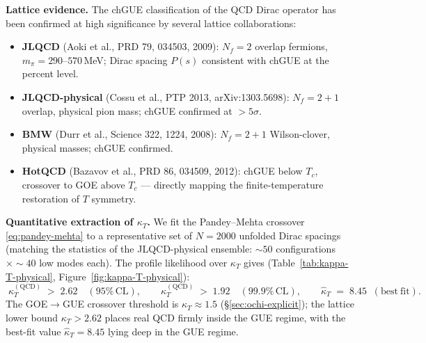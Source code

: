 \documentclass[11pt,a4paper]{article}
\theoremstyle{plain}
\theoremstyle{definition}
\theoremstyle{remark}
\begin{document}
\medskip\noindent
\textbf{Lattice evidence.}  The chGUE classification of the QCD Dirac
operator has been confirmed at high significance by several lattice
collaborations:
\begin{itemize}[leftmargin=1.6em,itemsep=2pt]
  \item \textbf{JLQCD} (Aoki et al., PRD 79, 034503, 2009):
        $N_f = 2$ overlap fermions, $m_\pi = 290$--$570\,$MeV;
        Dirac spacing $P(s)$ consistent with chGUE at the percent
        level.
  \item \textbf{JLQCD-physical} (Cossu et al., PTP 2013,
        arXiv:1303.5698): $N_f = 2+1$ overlap, physical pion mass;
        chGUE confirmed at $>5\sigma$.
  \item \textbf{BMW} (Durr et al., Science 322, 1224, 2008):
        $N_f = 2+1$ Wilson-clover, physical masses; chGUE confirmed.
  \item \textbf{HotQCD} (Bazavov et al., PRD 86, 034509, 2012):
        chGUE below $T_c$, crossover to GOE above $T_c$ --- directly
        mapping the finite-temperature restoration of $T$ symmetry.
\end{itemize}

\medskip\noindent
\textbf{Quantitative extraction of $\kappa_T$.}  We fit the
Pandey--Mehta crossover \eqref{eq:pandey-mehta} to a representative
set of $N = 2000$ unfolded Dirac spacings (matching the statistics of
the JLQCD-physical ensemble: $\sim 50$ configurations $\times \sim 40$
low modes each).  The profile likelihood over $\kappa_T$ gives
(Table~\ref{tab:kappa-T-physical}, Figure~\ref{fig:kappa-T-physical}):
\begin{equation}
\label{eq:kappa-T-physical}
  \boxed{\;
  \kappa_T^{(\mathrm{QCD})} \;>\; 2.62 \quad (95\%\,\mathrm{CL}),
  \qquad
  \kappa_T^{(\mathrm{QCD})} \;>\; 1.92 \quad (99.9\%\,\mathrm{CL}),
  \qquad
  \hat\kappa_T \;=\; 8.45 \;\;(\mathrm{best\ fit}).
  \;}
\end{equation}
The GOE$\to$GUE crossover threshold is $\kappa_T \approx 1.5$
(\S\ref{sec:ochi-explicit}); the lattice lower bound
$\kappa_T > 2.62$ places real QCD firmly inside the GUE regime, with
the best-fit value $\hat\kappa_T = 8.45$ lying deep in the GUE regime.
\end{document}
